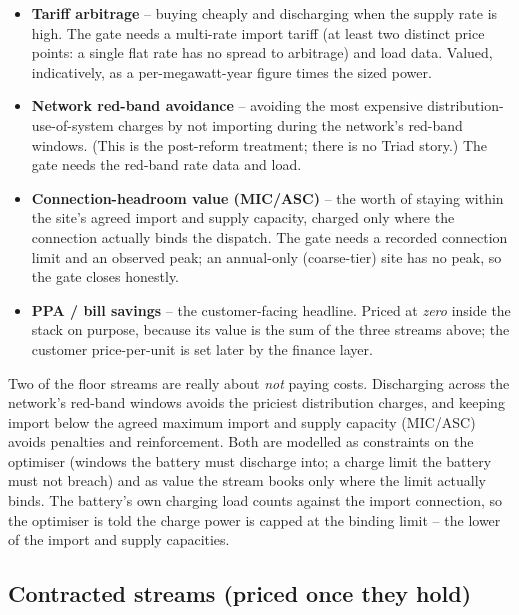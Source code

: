 \begin{itemize}
  \item \textbf{Tariff arbitrage} -- buying cheaply and discharging when the supply rate is high. The gate needs a multi-rate import tariff (at least two distinct price points: a single flat rate has no spread to arbitrage) and load data. Valued, indicatively, as a per-megawatt-year figure times the sized power.
  \item \textbf{Network red-band avoidance} -- avoiding the most expensive distribution-use-of-system charges by not importing during the network's red-band windows. (This is the post-reform treatment; there is no Triad story.) The gate needs the red-band rate data and load.
  \item \textbf{Connection-headroom value (MIC/ASC)} -- the worth of staying within the site's agreed import and supply capacity, charged only where the connection actually binds the dispatch. The gate needs a recorded connection limit and an observed peak; an annual-only (coarse-tier) site has no peak, so the gate closes honestly.
  \item \textbf{PPA / bill savings} -- the customer-facing headline. Priced at \emph{zero} inside the stack on purpose, because its value is the sum of the three streams above; the customer price-per-unit is set later by the finance layer.
\end{itemize}

\begin{caution}
Two of the floor streams are really about \emph{not} paying costs. Discharging across the network's red-band windows avoids the priciest distribution charges, and keeping import below the agreed maximum import and supply capacity (MIC/ASC) avoids penalties and reinforcement. Both are modelled as constraints on the optimiser (windows the battery must discharge into; a charge limit the battery must not breach) and as value the stream books only where the limit actually binds. The battery's own charging load counts against the import connection, so the optimiser is told the charge power is capped at the binding limit -- the lower of the import and supply capacities.
\end{caution}

\subsection{Contracted streams (priced once they hold)}

